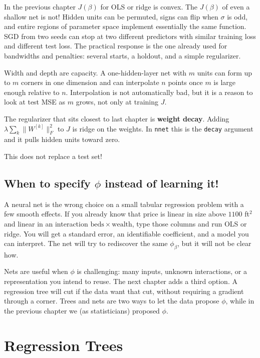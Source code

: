 \documentclass[
]{book}
\begin{document}
In the previous chapter \(J(\beta)\) for OLS or ridge is convex. The \(J(\beta)\) of even a shallow net is not! Hidden units can be permuted, signs can flip when \(\sigma\) is odd, and entire regions of parameter space implement essentially the same function. SGD from two seeds can stop at two different predictors with similar training loss and different test loss. The practical response is the one already used for bandwidths and penalties: several starts, a holdout, and a simple regularizer.

Width and depth are capacity. A one-hidden-layer net with \(m\) units can form up to \(m\) corners in one dimension and can interpolate \(n\) points once \(m\) is large enough relative to \(n\). Interpolation is not automatically bad, but it is a reason to look at test MSE as \(m\) grows, not only at training \(J\).

The regularizer that sits closest to last chapter is \textbf{weight decay}. Adding \(\lambda\sum_k\|W^{[k]}\|_F^2\) to \(J\) is ridge on the weights. In \texttt{nnet} this is the \texttt{decay} argument and it pulls hidden units toward zero.

This does not replace a test set!

\section{\texorpdfstring{When to specify \(\phi\) instead of learning it!}{When to specify \textbackslash phi instead of learning it!}}\label{when-to-specify-phi-instead-of-learning-it}

A neural net is the wrong choice on a small tabular regression problem with a few smooth effects. If you already know that price is linear in size above \(1100\) ft\(^2\) and linear in an interaction \(\mathrm{beds}\times\mathrm{wealth}\), type those columns and run OLS or ridge. You will get a standard error, an identifiable coefficient, and a model you can interpret. The net will try to rediscover the same \(\phi_\beta\), but it will not be clear how.

Nets are useful when \(\phi\) is challenging: many inputs, unknown interactions, or a representation you intend to reuse. The next chapter adds a third option. A regression tree will cut if the data want that cut, without requiring a gradient through a corner. Trees and nets are two ways to let the data propose \(\phi\), while in the previous chapter we (as statisticians) proposed \(\phi\).

\chapter{Regression Trees}\label{regression-trees}
\end{document}
